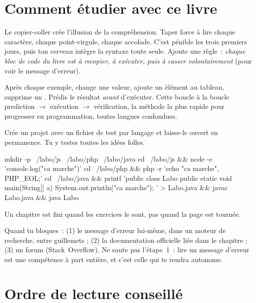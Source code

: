 \section{Comment \'etudier avec ce livre}

Le copier-coller cr\'ee l'illusion de la compr\'ehension. Taper force \`a lire chaque caract\`ere,
chaque point-virgule, chaque accolade. C'est p\'enible les trois premiers jours, puis
ton cerveau int\`egre la syntaxe toute seule. Ajoute une r\`egle~:
\emph{chaque bloc de code du livre est \`a recopier, \`a ex\'ecuter, puis \`a casser volontairement}
(pour voir le message d'erreur).

Apr\`es chaque exemple, change une valeur, ajoute un \`el\'ement au tableau, supprime un
. Pr\'edis le r\'esultat \emph{avant} d'ex\'ecuter. Cette boucle
\`a la boucle \og prediction $\rightarrow$ ex\'ecution $\rightarrow$ v\'erification\fg{}, la m\'ethode la plus rapide
pour progresser en programmation, toutes langues confondues.

Cr\'ee un projet  avec un fichier de test par langage et laisse-le ouvert
en permanence. Tu y testes toutes les id\'ees folles.

\begin{terminal}
mkdir -p ~/labo/js ~/labo/php ~/labo/java
cd ~/labo/js && node -e 'console.log("ca marche")'
cd ~/labo/php && php -r 'echo "ca marche", PHP_EOL;'
cd ~/labo/java && printf 'public class Labo { public static void main(String[] a){ System.out.println("ca marche"); } }' > Labo.java && javac Labo.java && java Labo
\end{terminal}

Un chapitre est fini quand les exercices le sont, pas quand la page est tourn\'ee.

Quand tu bloques~: (1) le message d'erreur lui-m\^eme, dans un moteur de recherche, entre guillemets ;
(2) la documentation officielle li\'ee dans le chapitre ; (3) un forum (Stack~Overflow).
Ne saute pas l'\'etape~1~: lire un message d'erreur est une comp\'etence \`a part enti\`ere,
et c'est celle qui te rendra autonome.

\section{Ordre de lecture conseill\'e}


